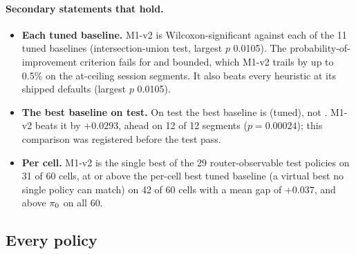 \paragraph{Secondary statements that hold.}
\begin{itemize}
  \item \textbf{Each tuned baseline.} M1-v2 is Wilcoxon-significant against each of the 11 tuned
    baselines (intersection-union test, largest $p$ 0.0105). The probability-of-improvement
    criterion fails for  and  bounded, which M1-v2 trails by
    up to 0.5\% on the at-ceiling session segments. It also beats every heuristic at its shipped defaults (largest $p$ 0.0105).
  \item \textbf{The best baseline on test.} On test the best baseline is 
    (tuned), not . M1-v2 beats it by $+0.0293$, ahead on 12 of 12 segments
    ($p = 0.00024$); this comparison was registered before the test pass.
  \item \textbf{Per cell.} M1-v2 is the single best of the 29 router-observable test policies on
    31 of 60 cells, at or above the per-cell best tuned baseline (a virtual best no single policy can
    match) on 42 of 60 cells with a mean gap of $+0.037$, and above $\pi_{0}$ on all 60.
\end{itemize}

\subsection{Every policy}
\label{sec:res-leaderboard}

